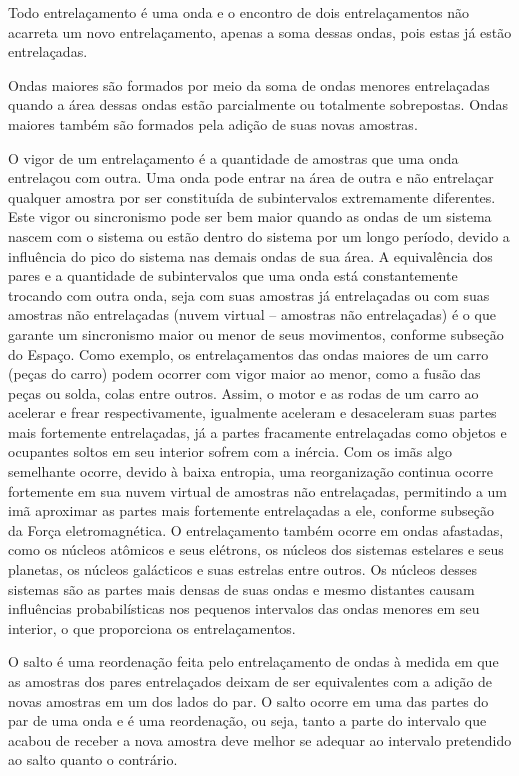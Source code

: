 Todo entrelaçamento é uma onda e o encontro de dois entrelaçamentos não acarreta um novo entrelaçamento, apenas a soma dessas ondas, pois estas já estão entrelaçadas.  

Ondas maiores são formados por meio da soma de ondas menores entrelaçadas quando a área dessas ondas estão parcialmente ou totalmente sobrepostas. Ondas maiores também são formados pela adição de suas novas amostras.

O vigor de um entrelaçamento é a quantidade de amostras que uma onda entrelaçou com outra. Uma onda pode entrar na área de outra e não entrelaçar qualquer amostra por ser constituída de subintervalos extremamente diferentes. Este vigor ou sincronismo pode ser bem maior quando as ondas de um sistema nascem com o sistema ou estão dentro do sistema por um longo período, devido a influência do pico do sistema nas demais ondas de sua área. A equivalência dos pares e a quantidade de subintervalos que uma onda está constantemente trocando com outra onda, seja com suas amostras já entrelaçadas ou com suas amostras não entrelaçadas (nuvem virtual – amostras não entrelaçadas) é o que garante um sincronismo maior ou menor de seus movimentos, conforme subseção do Espaço. Como exemplo, os entrelaçamentos das ondas maiores de um carro (peças do carro) podem ocorrer com vigor maior ao menor, como a fusão das peças ou solda, colas entre outros. Assim, o motor e as rodas de um carro ao acelerar e frear respectivamente, igualmente aceleram e desaceleram suas partes mais fortemente entrelaçadas, já a partes fracamente entrelaçadas como objetos e ocupantes soltos em seu interior sofrem com a inércia. Com os imãs algo semelhante ocorre, devido à baixa entropia, uma reorganização continua ocorre fortemente em sua nuvem virtual de amostras não entrelaçadas, permitindo a um imã aproximar as partes mais fortemente entrelaçadas a ele, conforme subseção da Força eletromagnética. O entrelaçamento também ocorre em ondas afastadas, como os núcleos atômicos e seus elétrons, os núcleos dos sistemas estelares e seus planetas, os núcleos galácticos e suas estrelas entre outros. Os núcleos desses sistemas são as partes mais densas de suas ondas e mesmo distantes causam influências probabilísticas nos pequenos intervalos das ondas menores em seu interior, o que proporciona os entrelaçamentos. 

O salto é uma reordenação feita pelo entrelaçamento de ondas à medida em que as amostras dos pares entrelaçados deixam de ser equivalentes com a adição de novas amostras em um dos lados do par. O salto ocorre em uma das partes do par de uma onda e é uma reordenação, ou seja, tanto a parte do intervalo que acabou de receber a nova amostra deve melhor se adequar ao intervalo pretendido ao salto quanto o contrário.


